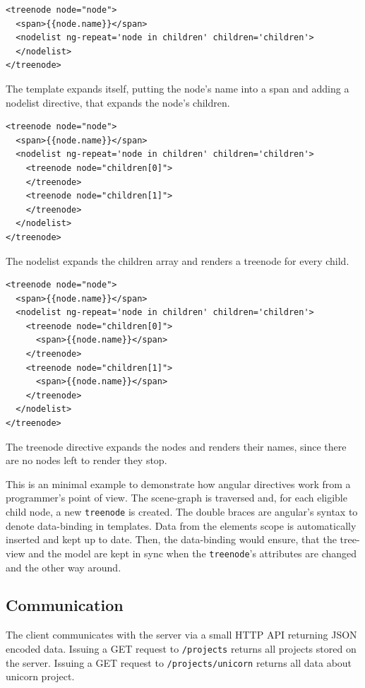 \begin{listing}[H]
  \begin{verbatim}
<treenode node="node">
  <span>{{node.name}}</span>
  <nodelist ng-repeat='node in children' children='children'>
  </nodelist>
</treenode>
  \end{verbatim}
  \caption{The template expands itself, putting the node's name into a span and adding a nodelist directive, that expands the node's children.}
  \label{list:angular2}
\end{listing}

\begin{listing}[H]
  \begin{verbatim}
<treenode node="node">
  <span>{{node.name}}</span>
  <nodelist ng-repeat='node in children' children='children'>
    <treenode node="children[0]">
    </treenode>
    <treenode node="children[1]">
    </treenode>
  </nodelist>
</treenode>
  \end{verbatim}
  \caption{The nodelist expands the children array and renders a treenode for every child.}
  \label{list:angular3}
\end{listing}

\begin{listing}[H]
  \begin{verbatim}
<treenode node="node">
  <span>{{node.name}}</span>
  <nodelist ng-repeat='node in children' children='children'>
    <treenode node="children[0]">
      <span>{{node.name}}</span>
    </treenode>
    <treenode node="children[1]">
      <span>{{node.name}}</span>
    </treenode>
  </nodelist>
</treenode>
  \end{verbatim}
  \caption{The treenode directive expands the nodes and renders their names, since there are no nodes left to render they stop.}
  \label{list:angular4}
\end{listing}




This is an minimal example to demonstrate how angular directives work from a programmer's point of view.
The scene-graph is traversed and, for each eligible child node, a new
\texttt{treenode} is created. The double braces are angular's syntax
to denote data-binding in templates. Data from the elements scope is
automatically inserted and kept up to date. Then, the data-binding would
ensure, that the tree-view and the model are kept in sync when the
\texttt{treenode}'s attributes are changed and the other way around.

\subsection{Communication}
\label{interaction}

The client communicates with the server via a small HTTP API returning \gls{JSON} encoded data.
Issuing a GET request to \texttt{/projects} returns all projects stored on the server.
Issuing a GET request to \texttt{/projects/unicorn} returns all data about unicorn project.
